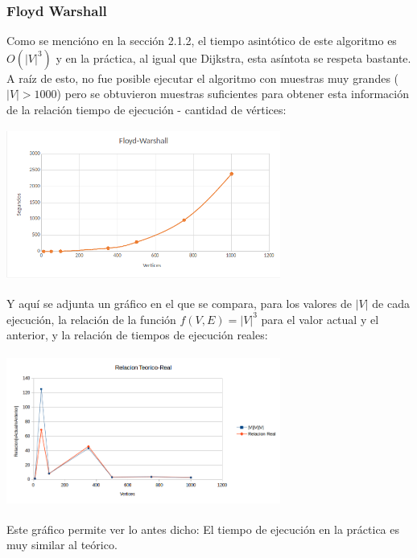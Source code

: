 \documentclass{article}
\newcommand\tab[1][0.5cm]{\hspace*{#1}}
\begin{document}
            \subsubsection{Floyd Warshall}
            \tab Como se mencióno en la sección 2.1.2, el tiempo asintótico de este algoritmo es $O(|V|^3)$ y en
            la práctica, al igual que Dijkstra, esta asíntota se respeta bastante. A raíz de esto, no fue posible
            ejecutar el algoritmo con muestras muy grandes ($|V| > 1000$) pero se obtuvieron muestras suficientes
            para obtener esta información de la relación tiempo de ejecución - cantidad de vértices:
            \begin{center}
                \includegraphics[width=9cm, height=5cm]{images/GraficoFloydWarshall}
            \end{center}
            \tab Y aquí se adjunta un gráfico en el que se compara, para los valores de $|V|$ de cada ejecución,
            la relación de la función $f(V, E) = |V|^3$ para el valor actual y el anterior, y la relación de
            tiempos de ejecución reales:
            \begin{center}
                \includegraphics[width=9cm, height=5cm]{images/RelacionFloydWarshall}
            \end{center}
            \tab Este gráfico permite ver lo antes dicho: El tiempo de ejecución en la práctica es muy similar
            al teórico.
\end{document}
